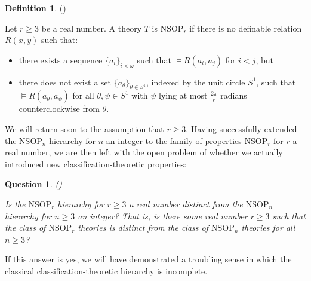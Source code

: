 \documentclass{amsart}
\newtheorem{question}[theorem]{Question}
\theoremstyle{definition}
\newtheorem{definition}[theorem]{Definition}
\theoremstyle{remark}
\numberwithin{equation}{section}
\begin{document}
\begin{definition}\label{real-valued hierarchy}(\cite{ApproxOrder})


Let $r \geq 3$ be a real number. A theory $T$ is $\mathrm{NSOP}_{r}$ if there is no definable relation $R(x, y)$ such that:

\begin{itemize}
    \item there exists a sequence $\{a_{i}\}_{i < \omega}$ such that $\models R(a_{i}, a_{j})$ for $i <j$, but

    \item there does not exist a set $\{a_{\theta}\}_{\theta \in S^{1}}$, indexed by the unit circle $S^{1}$, such that $\models R(a_{\theta}, a_{\psi})$ for all $\theta, \psi \in S^{1}$ with $\psi$ lying at most $\frac{2\pi}{r}$ radians counterclockwise from $\theta$.
\end{itemize}

\end{definition}


We will return soon to the assumption that $r \geq 3$. Having successfully extended the $\mathrm{NSOP}_{n}$ hierarchy for $n$ an integer to the family of properties $\mathrm{NSOP}_{r}$ for $r$ a real number, we are then left with the open problem of whether we actually introduced new classification-theoretic properties:

\begin{question}\label{disinctness question}(\cite{ApproxOrder})

Is the $\mathrm{NSOP}_{r}$ hierarchy for $r \geq 3$ a real number distinct from the $\mathrm{NSOP}_{n}$ hierarchy for $n \geq 3$ an integer? That is, is there some real number $r \geq 3$ such that the class of $\mathrm{NSOP}_{r}$ theories is distinct from the class of $\mathrm{NSOP}_{n}$ theories for all $n \geq 3$?

\end{question}

If this answer is yes, we will have demonstrated a troubling sense in which the classical classification-theoretic hierarchy is incomplete.
\end{document}
